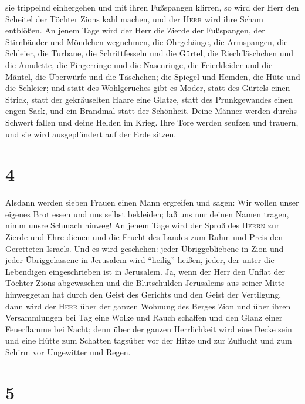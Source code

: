sie trippelnd einhergehen und mit ihren Fußspangen klirren,
 so wird der Herr den Scheitel der Töchter Zions kahl
machen, und der \textsc{Herr} wird ihre Scham entblößen. 
An jenem Tage wird der Herr die Zierde der Fußspangen, der Stirnbänder
und Möndchen wegnehmen,  die Ohrgehänge, die Armspangen,
die Schleier, die Turbane,  die Schrittfesseln und die
Gürtel, die Riechfläschchen und die Amulette,  die
Fingerringe und die Nasenringe,  die Feierkleider und die
Mäntel, die Überwürfe und die Täschchen;  die Spiegel und
Hemden, die Hüte und die Schleier;  und statt des
Wohlgeruches gibt es Moder, statt des Gürtels einen Strick, statt der
gekräuselten Haare eine Glatze, statt des Prunkgewandes einen engen
Sack, und ein Brandmal statt der Schönheit.  Deine Männer
werden durchs Schwert fallen und deine Helden im Krieg. 
Ihre Tore werden seufzen und trauern, und sie wird ausgeplündert auf der
Erde sitzen.

\hypertarget{section-3}{%
\section{4}\label{section-3}}

 Alsdann werden sieben Frauen einen Mann ergreifen und
sagen: Wir wollen unser eigenes Brot essen und uns selbst bekleiden; laß
uns nur deinen Namen tragen, nimm unsre Schmach hinweg! 
An jenem Tage wird der Sproß des \textsc{Herrn} zur Zierde und Ehre
dienen und die Frucht des Landes zum Ruhm und Preis den Geretteten
Israels.  Und es wird geschehen: jeder Übriggebliebene in
Zion und jeder Übriggelassene in Jerusalem wird ``heilig'' heißen,
jeder, der unter die Lebendigen eingeschrieben ist in Jerusalem.
 Ja, wenn der Herr den Unflat der Töchter Zions
abgewaschen und die Blutschulden Jerusalems aus seiner Mitte hinweggetan
hat durch den Geist des Gerichts und den Geist der Vertilgung,
 dann wird der \textsc{Herr} über der ganzen Wohnung des
Berges Zion und über ihren Versammlungen bei Tag eine Wolke und Rauch
schaffen und den Glanz einer Feuerflamme bei Nacht;  denn
über der ganzen Herrlichkeit wird eine Decke sein und eine Hütte zum
Schatten tagsüber vor der Hitze und zur Zuflucht und zum Schirm vor
Ungewitter und Regen.

\hypertarget{section-4}{%
\section{5}\label{section-4}}

